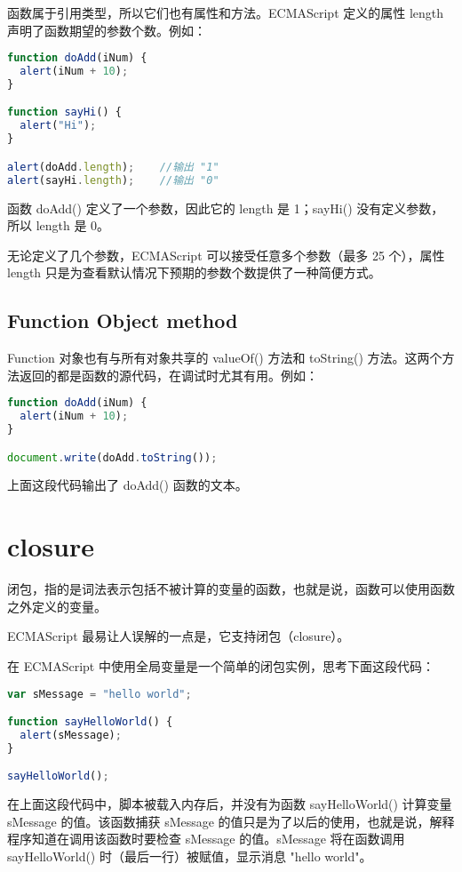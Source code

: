 函数属于引用类型，所以它们也有属性和方法。ECMAScript 定义的属性 length 声明了函数期望的参数个数。例如：


\begin{lstlisting}[language=JavaScript]
function doAdd(iNum) {
  alert(iNum + 10);
}

function sayHi() {
  alert("Hi");
}

alert(doAdd.length);	//输出 "1"
alert(sayHi.length);	//输出 "0"
\end{lstlisting}

函数 doAdd() 定义了一个参数，因此它的 length 是 1；sayHi() 没有定义参数，所以 length 是 0。

无论定义了几个参数，ECMAScript 可以接受任意多个参数（最多 25 个），属性 length 只是为查看默认情况下预期的参数个数提供了一种简便方式。




\section{Function Object method}

Function 对象也有与所有对象共享的 valueOf() 方法和 toString() 方法。这两个方法返回的都是函数的源代码，在调试时尤其有用。例如：

\begin{lstlisting}[language=JavaScript]
function doAdd(iNum) {
  alert(iNum + 10);
}

document.write(doAdd.toString());
\end{lstlisting}

上面这段代码输出了 doAdd() 函数的文本。

\chapter{closure}


闭包，指的是词法表示包括不被计算的变量的函数，也就是说，函数可以使用函数之外定义的变量。


ECMAScript 最易让人误解的一点是，它支持闭包（closure）。

在 ECMAScript 中使用全局变量是一个简单的闭包实例，思考下面这段代码：

\begin{lstlisting}[language=JavaScript]
var sMessage = "hello world";

function sayHelloWorld() {
  alert(sMessage);
}

sayHelloWorld();
\end{lstlisting}


在上面这段代码中，脚本被载入内存后，并没有为函数 sayHelloWorld() 计算变量 sMessage 的值。该函数捕获 sMessage 的值只是为了以后的使用，也就是说，解释程序知道在调用该函数时要检查 sMessage 的值。sMessage 将在函数调用 sayHelloWorld() 时（最后一行）被赋值，显示消息 "hello world"。

